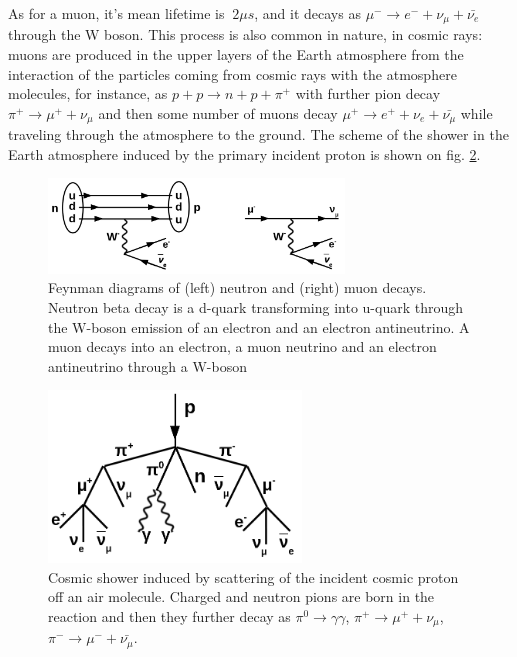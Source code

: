 As for a muon, it's mean lifetime is $~2 {\mu}s$, and it decays as ${\mu}^- \rightarrow e^- + {\nu}_{\mu} + \bar{{\nu}_e}$ through the W boson. This process is also common in nature, in cosmic rays: muons are produced in the upper layers of the Earth atmosphere from the interaction of the particles coming from cosmic rays with the atmosphere molecules, for instance, as $p+p \rightarrow n+p+\pi^+$ with further pion decay $\pi^+ \rightarrow \mu^+ + \nu_\mu$ and then some number of muons decay $\mu^+ \rightarrow e^+ + \nu_e + \bar{\nu_\mu}$ while traveling through the atmosphere to the ground. The scheme of the shower in the Earth atmosphere induced by the primary incident proton is shown on fig. \ref{fig:cosmicMuons}.   

\begin{figure}
\caption{Feynman diagrams of (left) neutron and (right) muon decays. Neutron beta decay is a d-quark transforming into u-quark through the W-boson emission of an electron and an electron antineutrino. A muon decays into an electron, a muon neutrino and an electron antineutrino through a W-boson}
\label{fig:MuonAndNeutronDecays}
\centering
\includegraphics[width=0.70\textwidth, keepaspectratio=true]{figs/NeutronAndMuonDecays.png}
\end{figure}

\begin{figure}
\caption{Cosmic shower induced by scattering of the incident cosmic proton off an air molecule. Charged and neutron pions are born in the reaction and then they further decay as $\pi^0 \rightarrow \gamma\gamma$, $\pi^+ \rightarrow \mu^+ + \nu_\mu$, $\pi^- \rightarrow \mu^- + \bar{\nu_\mu}$.}
\label{fig:cosmicMuons}
\centering
\includegraphics[width=0.60\textwidth, keepaspectratio=true]{figs/cosmicMuons.png}
\end{figure}



